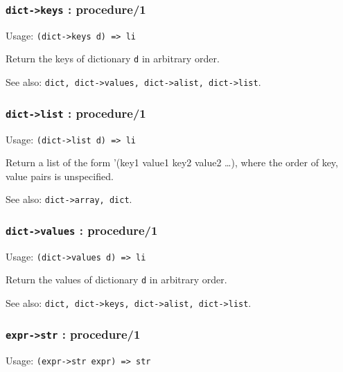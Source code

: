 \documentclass[
]{article}
\newcommand{\passthrough}[1]{#1}
\begin{document}
\hypertarget{dict-keys-procedure1}{%
\subsubsection{\texorpdfstring{\texttt{dict-\textgreater{}keys} :
procedure/1}{dict-\textgreater keys : procedure/1}}\label{dict-keys-procedure1}}

Usage: \passthrough{\lstinline!(dict->keys d) => li!}

Return the keys of dictionary \passthrough{\lstinline!d!} in arbitrary
order.

See also:
\passthrough{\lstinline!dict, dict->values, dict->alist, dict->list!}.

\hypertarget{dict-list-procedure1}{%
\subsubsection{\texorpdfstring{\texttt{dict-\textgreater{}list} :
procedure/1}{dict-\textgreater list : procedure/1}}\label{dict-list-procedure1}}

Usage: \passthrough{\lstinline!(dict->list d) => li!}

Return a list of the form '(key1 value1 key2 value2 \ldots), where the
order of key, value pairs is unspecified.

See also: \passthrough{\lstinline!dict->array, dict!}.

\hypertarget{dict-values-procedure1}{%
\subsubsection{\texorpdfstring{\texttt{dict-\textgreater{}values} :
procedure/1}{dict-\textgreater values : procedure/1}}\label{dict-values-procedure1}}

Usage: \passthrough{\lstinline!(dict->values d) => li!}

Return the values of dictionary \passthrough{\lstinline!d!} in arbitrary
order.

See also:
\passthrough{\lstinline!dict, dict->keys, dict->alist, dict->list!}.

\hypertarget{expr-str-procedure1}{%
\subsubsection{\texorpdfstring{\texttt{expr-\textgreater{}str} :
procedure/1}{expr-\textgreater str : procedure/1}}\label{expr-str-procedure1}}

Usage: \passthrough{\lstinline!(expr->str expr) => str!}
\end{document}
